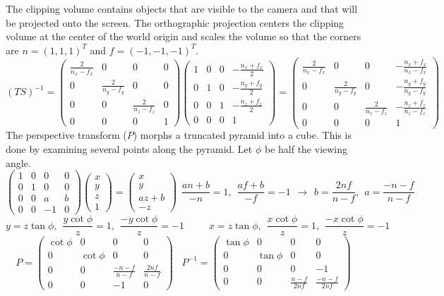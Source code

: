 \documentclass[10pt]{article}
\newcommand\m[1]{\begin{pmatrix}#1\end{pmatrix}}
\begin{document}
The clipping volume contains objects that are visible to the camera and that will be projected onto the screen. The orthographic projection centers the clipping volume at the center of the world origin and scales the volume so that the corners are $ n = (1, 1, 1)^T $ and $ f = (-1, -1, -1)^T $.
\[ (TS)^{-1} = \m{
\frac{2}{n_x-f_x} & 0 & 0 & 0 \\
0 & \frac{2}{n_y-f_y} & 0 & 0 \\
0 & 0 & \frac{2}{n_z-f_z} & 0 \\
0 & 0 & 0 & 1} \m{
1 & 0 & 0 & -\frac{n_x + f_x}{2} \\
0 & 1 & 0 & -\frac{n_y + f_y}{2} \\
0 & 0 & 1 & -\frac{n_z + f_z}{2} \\
0 & 0 & 0 & 1} = \m{
\frac{2}{n_x-f_x} & 0 & 0 & -\frac{n_x + f_x}{n_x-f_x} \\
0 & \frac{2}{n_y-f_y} & 0 & -\frac{n_y + f_y}{n_y-f_y} \\
0 & 0 & \frac{2}{n_z-f_z} & -\frac{n_z + f_z}{n_z-f_z} \\
0 & 0 & 0 & 1} \]
The perspective transform ($ P $) morphs a truncated pyramid into a cube. This is done by examining several points along the pyramid. Let $\phi$ be half the viewing angle.
\[ \m{
1 & 0 & 0 & 0 \\
0 & 1 & 0 & 0 \\
0 & 0 & a & b \\
0 & 0 & -1 & 0}
\m{x \\ y \\ z \\ 1} =
\m{x \\ y \\ az + b \\ -z}
\hspace{5pt}
\frac{an + b}{-n} = 1, \hspace{5pt}
\frac{af + b}{-f} = -1
\hspace{5pt}\rightarrow\hspace{5pt}
b = \frac{2nf}{n-f}, \hspace{5pt}
a = \frac{-n-f}{n-f} \]
\[ y = z\tan\phi, \hspace{5pt} \frac{y\cot\phi}{z} = 1, \hspace{5pt} \frac{-y\cot\phi}{z} = -1 \hspace{30pt} x = z\tan\phi, \hspace{5pt} \frac{x\cot\phi}{z} = 1, \hspace{5pt} \frac{-x\cot\phi}{z} = -1 \]
\[ P = \m{
\cot\phi & 0 & 0 & 0 \\
0 & \cot\phi & 0 & 0 \\
0 & 0 &\frac{-n-f}{n-f} & \frac{2nf}{n-f} \\
0 & 0 & -1 & 0}
\hspace{10pt}
P^{-1} = \m{
\tan\phi & 0 & 0 & 0 \\
0 & \tan\phi & 0 & 0 \\
0 & 0 & 0 & -1 \\
0 & 0 & \frac{n-f}{2nf} & \frac{-n-f}{2nf}} \]
\end{document}
